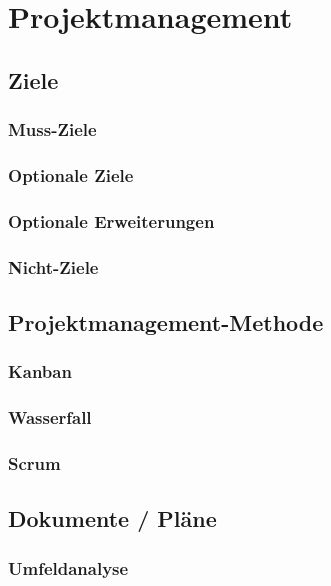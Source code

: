 \chapter{Projektmanagement}
\renewcommand{\kapitelautor}{}

\section{Ziele}

  \subsection{Muss-Ziele}

  \subsection{Optionale Ziele}

  \subsection{Optionale Erweiterungen}

  \subsection{Nicht-Ziele}

\section{Projektmanagement-Methode}

  \subsection{Kanban}

  \subsection{Wasserfall}

  \subsection{Scrum}

\section{Dokumente / Pläne}

  \subsection{Umfeldanalyse}

